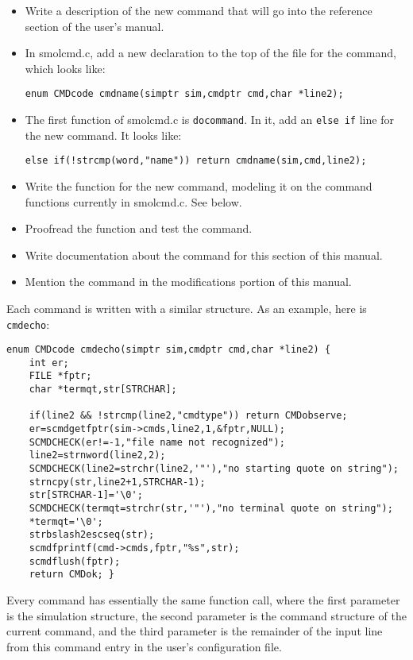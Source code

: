 \documentclass {scrbook}
\newcommand {\ttt} {\texttt}
\begin{document}
\begin{itemize}
\item Write a description of the new command that will go into the reference section of the user's manual.
\item In smolcmd.c, add a new declaration to the top of the file for the command, which looks like:
\begin{lstlisting}
enum CMDcode cmdname(simptr sim,cmdptr cmd,char *line2);
\end{lstlisting}
\item The first function of smolcmd.c is \ttt{docommand}. In it, add an \ttt{else if} line for the new command. It looks like:
\begin{lstlisting}
else if(!strcmp(word,"name")) return cmdname(sim,cmd,line2);
\end{lstlisting}
\item Write the function for the new command, modeling it on the command functions currently in smolcmd.c. See below.
\item Proofread the function and test the command.
\item Write documentation about the command for this section of this manual.
\item Mention the command in the modifications portion of this manual.
\end{itemize}

Each command is written with a similar structure. As an example, here is \ttt{cmdecho}:

\begin{lstlisting}
enum CMDcode cmdecho(simptr sim,cmdptr cmd,char *line2) {
	int er;
	FILE *fptr;
	char *termqt,str[STRCHAR];

	if(line2 && !strcmp(line2,"cmdtype")) return CMDobserve;
	er=scmdgetfptr(sim->cmds,line2,1,&fptr,NULL);
	SCMDCHECK(er!=-1,"file name not recognized");
	line2=strnword(line2,2);
	SCMDCHECK(line2=strchr(line2,'"'),"no starting quote on string");
	strncpy(str,line2+1,STRCHAR-1);
	str[STRCHAR-1]='\0';
	SCMDCHECK(termqt=strchr(str,'"'),"no terminal quote on string");
	*termqt='\0';
	strbslash2escseq(str);
	scmdfprintf(cmd->cmds,fptr,"%s",str);
	scmdflush(fptr);
	return CMDok; }
\end{lstlisting}

Every command has essentially the same function call, where the first parameter is the simulation structure, the second parameter is the command structure of the current command, and the third parameter is the remainder of the input line from this command entry in the user's configuration file.
\end{document}
